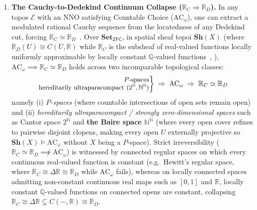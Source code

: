 \documentclass[10pt,twoside,openright]{book}
\theoremstyle{crmplain}
\theoremstyle{crmdef}
\theoremstyle{crmremark}
\begin{document}
\begin{enumerate}[label=\textbf{\arabic*.},leftmargin=1.8em]

  \item \textbf{The Cauchy-to-Dedekind Continuum Collapse ($\mathbb{R}_C \Rightarrow \mathbb{R}_D$).} In any topos $\mathcal{E}$ with an $\mathrm{NNO}$ satisfying Countable Choice ($\mathrm{AC}_\omega$), one can extract a modulated rational Cauchy sequence from the locatedness of any Dedekind cut, forcing $\mathbb{R}_C \simeq \mathbb{R}_D$~\cite[\S D4.7, Thms.~D4.7.10--D4.7.12]{Johnstone02}. Over $\mathbf{Set}_{\mathsf{ZFC}}$, in spatial sheaf topoi $\mathbf{Sh}(X)$ (where $\mathbb{R}_D(U) \cong C(U, \mathbb{R})$ while $\mathbb{R}_C$ is the subsheaf of real-valued functions locally uniformly approximable by locally constant $\mathbb{Q}$-valued functions~\cite[\S\S 2--3]{FourmanHyland79}, \cite[D4.7.10--D4.7.12]{Johnstone02}), $\mathrm{AC}_\omega \implies \mathbb{R}_C \simeq \mathbb{R}_D$ holds across two incomparable topological classes:
\[
  {\small\left.\begin{array}{@{}r@{}}
    \text{$P$-spaces} \\
    \text{hereditarily ultraparacompact } (2^{\mathbb{N}}, \mathbb{N}^{\mathbb{N}})
  \end{array}\right\}
  \;\Rightarrow\; \mathrm{AC}_\omega \;\Rightarrow\; \mathbb{R}_C \simeq \mathbb{R}_D}
\]
namely (i) \emph{$P$-spaces} (where countable intersections of open sets remain open) and (ii) \emph{hereditarily ultraparacompact / strongly zero-dimensional spaces} such as Cantor space $2^{\mathbb{N}}$ and \textbf{the Baire space $\mathbb{N}^{\mathbb{N}}$} (where every open cover refines to pairwise disjoint clopens, making every open $U$ externally projective so $\mathbf{Sh}(X) \models \mathrm{AC}_\omega$ without $X$ being a $P$-space). Strict irreversibility ($\mathbb{R}_C \simeq \mathbb{R}_D \not\implies \mathrm{AC}_\omega$) is witnessed by connected regular spaces on which every continuous real-valued function is constant (e.g.\ Hewitt's regular space, where $\mathbb{R}_C \cong \Delta\mathbb{R} \cong \mathbb{R}_D$ while $\mathrm{AC}_\omega$ fails), whereas on locally connected spaces admitting non-constant continuous real maps such as $[0, 1]$ and $\mathbb{R}$, locally constant $\mathbb{Q}$-valued functions on connected opens are constant, collapsing $\mathbb{R}_C \cong \Delta\mathbb{R} \subsetneq C(-, \mathbb{R}) \cong \mathbb{R}_D$.


\end{enumerate}
\end{document}
